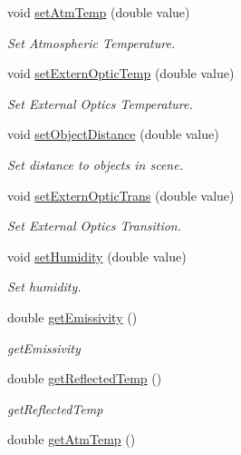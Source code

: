 \begin{DoxyCompactItemize}
void \hyperlink{classwtl_1_1_sequence_radiometric_ac98bfc0193618acc5d62518fb058736b}{set\+Atm\+Temp} (double value)
\begin{DoxyCompactList}\small\item\em Set Atmospheric Temperature. \end{DoxyCompactList}\item 
void \hyperlink{classwtl_1_1_sequence_radiometric_ae34dbec81e6a10de1456e3b4688cfe3c}{set\+Extern\+Optic\+Temp} (double value)
\begin{DoxyCompactList}\small\item\em Set External Optics Temperature. \end{DoxyCompactList}\item 
void \hyperlink{classwtl_1_1_sequence_radiometric_a4b9f85995050a4a683fdd0eed97bbee4}{set\+Object\+Distance} (double value)
\begin{DoxyCompactList}\small\item\em Set distance to objects in scene. \end{DoxyCompactList}\item 
void \hyperlink{classwtl_1_1_sequence_radiometric_a4d8e72885a532ca7f69a08f81f6595cd}{set\+Extern\+Optic\+Trans} (double value)
\begin{DoxyCompactList}\small\item\em Set External Optics Transition. \end{DoxyCompactList}\item 
void \hyperlink{classwtl_1_1_sequence_radiometric_a87da464d019d313a67609a7c99ea8e4e}{set\+Humidity} (double value)
\begin{DoxyCompactList}\small\item\em Set humidity. \end{DoxyCompactList}\item 
double \hyperlink{classwtl_1_1_sequence_radiometric_ad063c67b479c8fb33a77205ecfbd48d7}{get\+Emissivity} ()
\begin{DoxyCompactList}\small\item\em get\+Emissivity \end{DoxyCompactList}\item 
double \hyperlink{classwtl_1_1_sequence_radiometric_a1ea0a824608afd40f7dfda8c8539a269}{get\+Reflected\+Temp} ()
\begin{DoxyCompactList}\small\item\em get\+Reflected\+Temp \end{DoxyCompactList}\item 
double \hyperlink{classwtl_1_1_sequence_radiometric_adb55fc5e945d0a7972b0b2ffda3e8c36}{get\+Atm\+Temp} ()

\end{DoxyCompactItemize}
